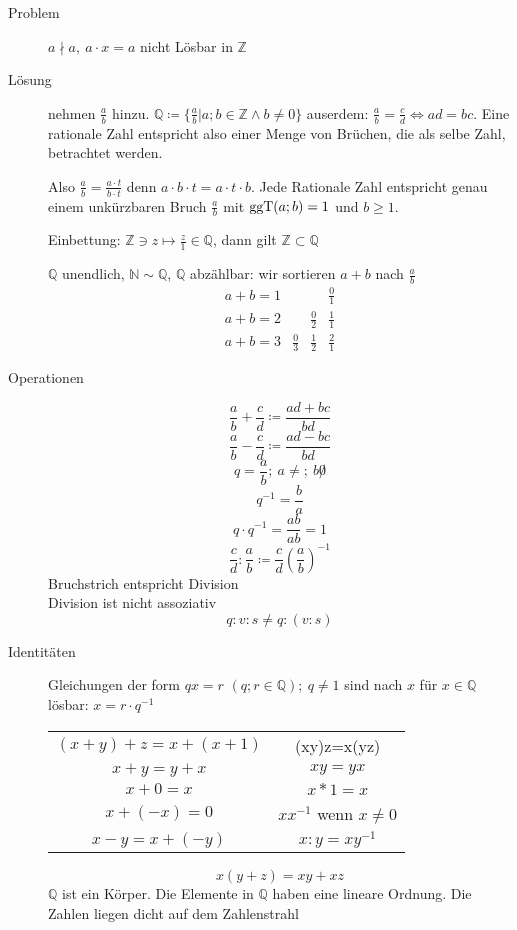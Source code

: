 \begin{description}
    \item[Problem] $a \nmid a,\ a \cdot x = a$ nicht Lösbar in $\mathbb{Z}$
    \item[Lösung] nehmen $\frac{a}{b}$ hinzu. $\mathbb{Q} \coloneqq \lbrace \frac{a}{b} | a;b \in \mathbb{Z} \wedge b \not = 0 \rbrace$ auserdem: $\frac{a}{b} = \frac{c}{d} \Leftrightarrow ad = bc$. Eine rationale Zahl entspricht also einer Menge von Brüchen, die als selbe Zahl, betrachtet werden.

    Also $\frac{a}{b} = \frac{a \cdot t}{b \cdot t}$ denn $a \cdot b \cdot t = a \cdot t \cdot b$. Jede Rationale Zahl entspricht genau einem unkürzbaren Bruch $\frac{a}{b}$ mit $\operatorname{ggT}(a;b) = 1$ und $b \geq 1$.

    Einbettung: $\mathbb{Z}\ni z \longmapsto \frac{z}{1} \in \mathbb{Q}$, dann gilt $\mathbb{Z} \subset \mathbb{Q}$

    $\mathbb{Q}$ unendlich, $\mathbb{N} \sim \mathbb{Q}$, $\mathbb{Q}$ abzählbar: wir sortieren $a + b$ nach $\frac{a}{b}$
    $$\begin{array}{lccc}
          a + b = 1 &             &             & \frac{0}{1} \\
          a + b = 2 &             & \frac{0}{2} & \frac{1}{1} \\
          a + b = 3 & \frac{0}{3} & \frac{1}{2} & \frac{2}{1}
    \end{array}$$
    \item[Operationen]
    $$\frac{a}{b} + \frac{c}{d} \coloneqq \frac{ad+bc}{bd}$$
    $$\frac{a}{b} - \frac{c}{d} \coloneqq \frac{ad-bc}{bd}$$
    $$q = \frac{a}{b};\ a \not =;\ b \not 0$$
    $$q^{-1} = \frac{b}{a}$$
    $$q \cdot q^{-1} = \frac{ab}{ab} = 1$$
    $$\frac{c}{d}:\frac{a}{b}\coloneqq\frac{c}{d}  \left(\frac{a}{b}\right)^{-1}$$
    Bruchstrich entspricht Division \\
    Division ist nicht assoziativ
    $$q:v:s \not = q:(v:s)$$
    \item[Identitäten] Gleichungen der form $qx=r$ $(q;r \in \mathbb{Q});\ q \not = 1$ sind nach $x$ für $x\in \mathbb{Q}$ lösbar: $x = r \cdot q^{-1}$ \\
    \begin{tabular}[t]{cc}
        $(x+y)+z = x+(x+1)$ & (xy)z=x(yz)                 \\
        $x + y = y + x$     & $xy = yx$                   \\
        $x + 0 = x$         & $x * 1 = x$                 \\
        $x + (-x) = 0$      & $xx^{-1}$ wenn $x \not = 0$ \\
        $x - y = x + (-y)$  & $x:y = xy^{-1}$
    \end{tabular}
    $$x(y+z) = xy + xz$$
    $\mathbb{Q}$ ist ein Körper. Die Elemente in $\mathbb{Q}$ haben eine  lineare Ordnung. Die Zahlen liegen dicht auf dem Zahlenstrahl
\end{description}